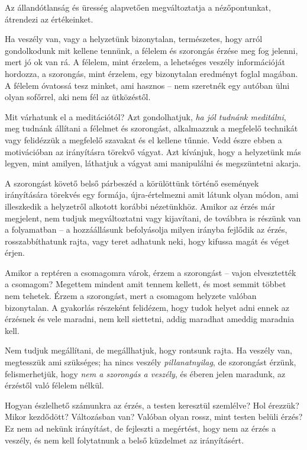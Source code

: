 Az állandótlanság és üresség alapvetően megváltoztatja a nézőpontunkat,
átrendezi az értékeinket.

Ha veszély van, vagy a helyzetünk bizonytalan, természetes, hogy arról
gondolkodunk mit kellene tennünk, a félelem és szorongás érzése meg fog
jelenni, mert jó ok van rá. A félelem, mint érzelem, a lehetséges
veszély információját hordozza, a szorongás, mint érzelem, egy
bizonytalan eredményt foglal magában. A félelem óvatossá tesz minket,
ami hasznos -- nem szeretnék egy autóban ülni olyan sofőrrel, aki nem
fél az ütközéstől.

Mit várhatunk el a meditációtól? Azt gondolhatjuk, \emph{ha jól tudnánk
meditálni}, meg tudnánk állítani a félelmet és szorongást, alkalmazzuk a
megfelelő technikát vagy felidézzük a megfelelő szavakat és el kellene
tűnnie. Vedd észre ebben a motivációban az irányításra törekvő vágyat.
Azt kívánjuk, hogy a helyzetünk más legyen, mint amilyen, láthatjuk a
vágyat ami manipulálni és megszüntetni akarja.

A szorongást követő belső párbeszéd a körülöttünk történő események
irányítására törekvés egy formája, újra-értelmezni amit látunk olyan
módon, ami illeszkedik a helyzetről alkotott korábbi nézetünkhöz. Amikor
az érzés már megjelent, nem tudjuk megváltoztatni vagy kijavítani, de
továbbra is részünk van a folyamatban -- a hozzáállásunk befolyásolja
milyen irányba fejlődik az érzés, rosszabbíthatunk rajta, vagy teret
adhatunk neki, hogy kifussa magát és véget érjen.

Amikor a reptéren a csomagomra várok, érzem a szorongást -- vajon
elvesztették a csomagom? Megettem mindent amit tennem kellett, és most
semmit többet nem tehetek. Érzem a szorongást, mert a csomagom helyzete
valóban bizonytalan. A gyakorlás részeként felidézem, hogy tudok helyet
adni ennek az érzésnek és vele maradni, nem kell siettetni, addig
maradhat ameddig maradnia kell.

Nem tudjuk megállítani, de megállhatjuk, hogy rontsunk rajta. Ha veszély
van, megtesszük ami szükséges; ha nincs veszély \emph{pillanatnyilag},
de szorongást érzünk, felismerhetjük, hogy \emph{nem a szorongás a
veszély}, és éberen jelen maradunk, az érzéstől való félelem nélkül.

Hogyan észlelhető számunkra az érzés, a testen keresztül szemlélve? Hol
érezzük? Mikor kezdődött? Változásban van? Valóban olyan rossz, mint
testen belüli érzés? Ez nem ad nekünk irányítást, de fejleszti a
megértést, hogy nem az érzés a veszély, és nem kell folytatnunk a belső
küzdelmet az irányításért.

